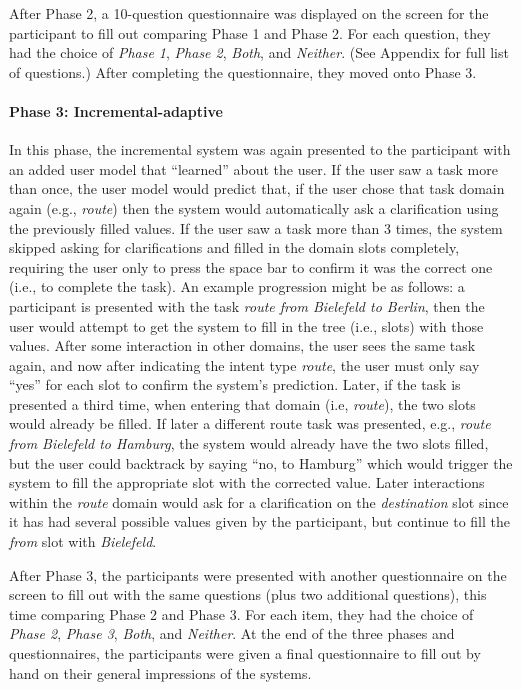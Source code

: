 \documentclass[11pt]{article}
\begin{document}
After Phase 2, a 10-question questionnaire was displayed on the screen for the participant to fill out comparing Phase 1 and Phase 2. For each question, they had the choice of \emph{Phase 1}, \emph{Phase 2}, \emph{Both}, and \emph{Neither}. (See Appendix for full list of questions.) After completing the questionnaire, they moved onto Phase 3.

\paragraph{Phase 3: Incremental-adaptive} In this phase, the incremental system was again presented to the participant with an added user model that ``learned'' about the user. If the user saw a task more than once, the user model would predict that, if the user chose that task domain again (e.g., \emph{route}) then the system would automatically ask a clarification using the previously filled values. If the user saw a task more than 3 times, the system skipped asking for clarifications and filled in the domain slots completely, requiring the user only to press the space bar to confirm it was the correct one (i.e., to complete the task). An example progression might be as follows: a participant is presented with the task \emph{route from Bielefeld to Berlin}, then the user would attempt to get the system to fill in the tree (i.e., slots) with those values. After some interaction in other domains, the user sees the same task again, and now after indicating the intent type \emph{route}, the user must only say ``yes'' for each slot to confirm the system's prediction. Later, if the task is presented a third time, when entering that domain (i.e, \emph{route}), the two slots would already be filled. If later a different route task was presented, e.g., \emph{route from Bielefeld to Hamburg}, the system would already have the two slots filled, but the user could backtrack by saying ``no, to Hamburg'' which would trigger the system to fill the appropriate slot with the corrected value. Later interactions within the \emph{route} domain would ask for a clarification on the \emph{destination} slot since it has had several possible values given by the participant, but continue to fill the \emph{from} slot with \emph{Bielefeld}.

After Phase 3, the participants were presented with another questionnaire on the screen to fill out with the same questions (plus two additional questions), this time comparing Phase 2 and Phase 3. For each item, they had the choice of \emph{Phase 2}, \emph{Phase 3}, \emph{Both}, and \emph{Neither}. At the end of the three phases and questionnaires, the participants were given a final questionnaire to fill out by hand on their general impressions of the systems. 
\end{document}
